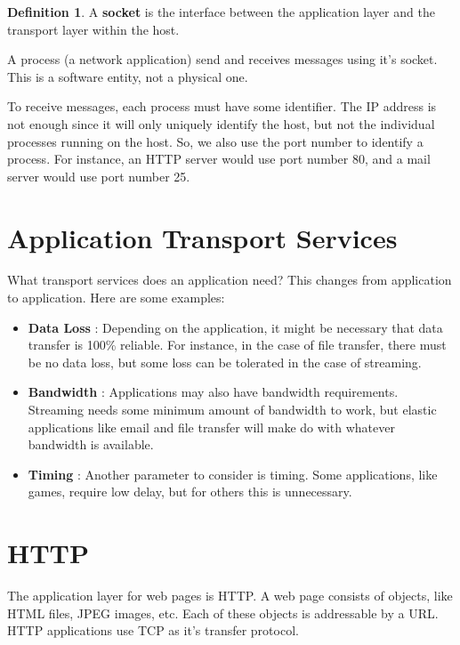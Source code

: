 \documentclass[12pt,letterpaper]{amsbook}
\theoremstyle{definition}
\newtheorem{definition}{Definition}[section] %
\begin{document}
\begin{definition}
  A \textbf{socket} is the interface between the application layer and the transport layer within the host.  
\end{definition}

A process (a network application) send and receives messages using it's socket. This is a software entity, not a physical one.

To receive messages, each process must have some identifier. The IP address is not enough since it will only uniquely identify the host, but not the individual processes running on the host. So, we also use the port number to identify a process. For instance, an HTTP server would use port number 80, and a mail server would use port number 25.

\section{Application Transport Services}

What transport services does an application need? This changes from application to application. Here are some examples:

\begin{itemize}
  \item \textbf{Data Loss} : Depending on the application, it might be necessary that data transfer is 100\% reliable. For instance, in the case of file transfer, there must be no data loss, but some loss can be tolerated in the case of streaming.
  \item \textbf{Bandwidth} : Applications may also have bandwidth requirements. Streaming needs some minimum amount of bandwidth to work, but elastic applications like email and file transfer will make do with whatever bandwidth is available.
  \item \textbf{Timing} : Another parameter to consider is timing. Some applications, like games, require low delay, but for others this is unnecessary.
\end{itemize}

\section{HTTP}

The application layer for web pages is HTTP. A web page consists of objects, like HTML files, JPEG images, etc. Each of these objects is addressable by a URL. HTTP applications use TCP as it's transfer protocol. 
\end{document}
